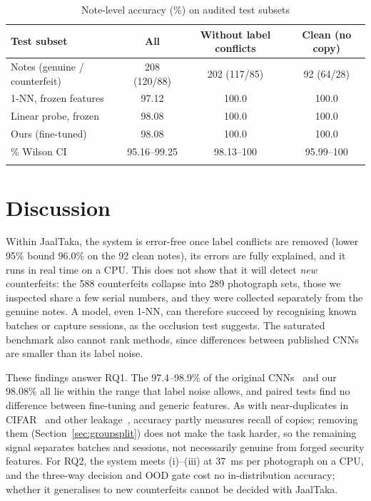 \documentclass[pdflatex,sn-mathphys-num]{sn-jnl}
\begin{document}
\begin{table}[!htbp]
\caption{Note-level accuracy (\%) on audited test subsets}\label{tab:clean}
\begin{tabular*}{\textwidth}{@{\extracolsep\fill}lccc}
\toprule
Test subset & All & Without label conflicts & Clean (no copy) \\
\midrule
Notes (genuine / counterfeit) & 208 (120/88) & 202 (117/85) & 92 (64/28) \\
\midrule
1-NN, frozen features & 97.12 & 100.0 & 100.0 \\
Linear probe, frozen & 98.08 & 100.0 & 100.0 \\
Ours (fine-tuned) & 98.08 & 100.0 & 100.0 \\
\quad 95\% Wilson CI & 95.16--99.25 & 98.13--100 & 95.99--100 \\
\botrule
\end{tabular*}
\end{table}

\section{Discussion}\label{sec:discussion}

Within JaalTaka, the system is error-free once label conflicts are removed (lower 95\%
bound 96.0\% on the 92 clean notes), its errors are fully explained, and it runs in real
time on a CPU. This does not show that it will detect \emph{new} counterfeits: the 588
counterfeits collapse into 289 photograph sets, those we inspected share a few serial
numbers, and they were collected separately from the genuine notes. A model, even 1-NN,
can therefore succeed by recognising known batches or capture sessions, as the occlusion
test suggests. The saturated benchmark also cannot rank methods, since differences
between published CNNs are smaller than its label noise.

These findings answer RQ1. The 97.4--98.9\% of the original
CNNs~\cite{piyas2025jaaltaka} and our 98.08\% all lie within the range that label noise
allows, and paired tests find no difference between fine-tuning and generic features.
As with near-duplicates in CIFAR~\cite{barz2020cifair} and other
leakage~\cite{kapoor2023leakage}, accuracy partly measures recall of copies; removing
them (Section~\ref{sec:groupsplit}) does not make the task harder, so the remaining
signal separates batches and sessions, not necessarily genuine from forged security
features. For RQ2, the system meets (i)--(iii) at 37~ms per photograph on a CPU, and the
three-way decision and OOD gate cost no in-distribution accuracy; whether it generalises
to new counterfeits cannot be decided with JaalTaka.
\end{document}
